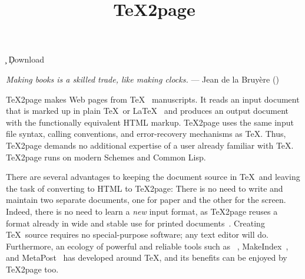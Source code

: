 %





\ifx\TZPtitle\UnDeFiNeD
\def\TZPtitle{TeX2page}\fi

\title{\TeX2page}

\smallskip

\c{}
%
\ifx\inpltdist\Undefined
\ifx\shipout\UnDeFiNeD
\c{Download
}
\fi
\fi
%


\ifx\shipout\UnDeFiNeD
\centerline{}
\fi

{\obeylines\raggedleft
\ifx\shipout\UnDeFiNeD\small\fi
{\it Making books is a skilled trade,
like making clocks.}
--- Jean de la Bruy\`ere ()
}


\medskip


\n
\TeX2page
makes Web pages
from \TeX~\cite{tex} manuscripts.
It reads an
input document that is marked up in
plain \TeX\ or \LaTeX~\cite{latex}
and
produces an output document with the functionally
equivalent HTML markup.
\TeX2page uses the same input
file syntax, calling conventions, and  error-recovery
mechanisms as \TeX.  Thus, \TeX2page demands no additional
expertise of a user already familiar with \TeX.
\TeX2page runs on modern Schemes and Common Lisp.

There are several advantages to keeping the document
source in \TeX\ and leaving the task of converting to
HTML to \TeX2page:  There is no need to write and
maintain two separate documents, one for paper and the
other for the screen.  Indeed, there is no need to
learn a {\em new} input format, as \TeX2page reuses a
format already in wide and stable use for printed
documents~\cite{tug,ctan}.  Creating \TeX\
source requires no special-purpose software; any text
editor will do.  Furthermore, an ecology of powerful and
reliable tools such as \BibTeX~\cite{bibtex},
MakeIndex~\cite{makeindex}, and
MetaPost~\cite{metapost} has developed around \TeX, and
its benefits can be enjoyed by \TeX2page too.

